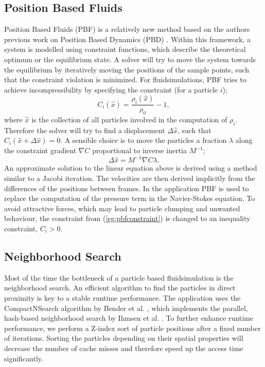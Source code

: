 \documentclass[11pt, letterpaper, twocolumn]{article}
\begin{document}
\subsection{Position Based Fluids}
\label{subsec:pbf}

Position Based Fluids (PBF) is a relatively new method based on the authors previous work on Position Based Dynamics (PBD) \cite{muller2007}.
Within this framework, a system is modelled using constraint functions, which describe the theoretical optimum or the equilibrium state. A solver will try to move the system towards the equilibrium by iteratively moving the positions of the sample points, such that the constraint violation is minimized. For fluidsimulations, PBF tries to achieve incompressibility by specifying the constraint (for a particle \(i\));
\begin{equation}
  C_i(\hat{x}) = \frac{\rho_i(\hat{x})}{\rho_0} - 1,
  \label{eg:pbfconstraint}
\end{equation}
where \(\hat{x}\) is the collection of all particles involved in the computation of \(\rho_i\). Therefore the solver will try to find a displacement \(\Delta \hat{x}\), such that \( C_i(\hat{x} + \Delta\hat{x}) = 0\). A sensible choice is to move the particles a fraction \(\lambda\) along the constraint gradient \(\nabla C\) proportional to inverse inertia \(M^{-1}\);
\begin{equation}
  \Delta\hat{x} = M^{-1} \nabla C \lambda.
  \label{eg:deltax}
\end{equation}
An approximate solution to the linear equation above is derived using a method similar to a Jacobi iteration. The velocities are then derived implicitly from the differences of the positions between frames.
In the application PBF is used to replace the computation of the pressure term in the Navier-Stokes equation. To avoid attractive forces, which may lead to particle clumping and unwanted behaviour, the constraint from (\ref{eg:pbfconstraint}) is changed to an inequality constraint, \(C_i > 0\).

\subsection{Neighborhood Search}
Most of the time the bottleneck of a particle based fluidsimulation is the neighborhood search.
An efficient algorithm to find the particles in direct proximity is key to a stable runtime performance. The application uses the CompactNSearch algorithm by Bender et al. \cite{bender2015}, which implements the parallel, hash-based neighborhood search by Ihmsen et al. \cite{ihmsen2011}. To further enhance runtime performance, we perform a Z-index sort of particle positions after a fixed number of iterations. Sorting the particles depending on their spatial properties will decrease the number of cache misses and therefore speed up the access time significantly.
\end{document}
